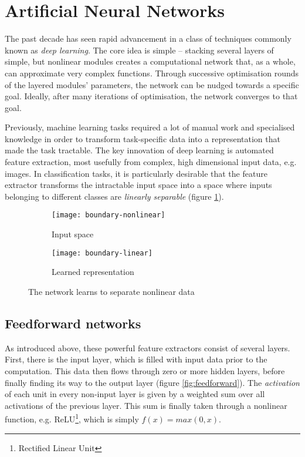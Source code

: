 \documentclass[../../report.tex]{subfiles}
\begin{document}
\section{Artificial Neural Networks}

The past decade has seen rapid advancement in a class of techniques commonly
known as \emph{deep learning}. The core idea is simple -- stacking several
layers of simple, but nonlinear modules creates a computational network that, as
a whole, can approximate very complex functions. Through successive optimisation
rounds of the layered modules' parameters, the network can be nudged towards a
specific goal. Ideally, after many iterations of optimisation, the network
converges to that goal.

Previously, machine learning tasks required a lot of manual work and specialised
knowledge in order to transform task-specific data into a representation that
made the task tractable. The key innovation of deep learning is automated
feature extraction, most usefully from complex, high dimensional input data,
e.g. images. In classification tasks, it is particularly desirable that the
feature extractor transforms the intractable input space into a space where
inputs belonging to different classes are \emph{linearly separable} (figure
\ref{fig:representation-learning}). \cite{LeCun2015}

\begin{figure}
  \centering
  \begin{subfigure}[b]{0.49\textwidth}
    \centering
    \texttt{[image: boundary-nonlinear]}
    \caption{Input space}
  \end{subfigure}
  \hfill
  \begin{subfigure}[b]{0.49\textwidth}
    \centering
    \texttt{[image: boundary-linear]}
    \caption{Learned representation}
  \end{subfigure}
  \caption{The network learns to separate nonlinear data \cite{Olah2014}}
  \label{fig:representation-learning}
\end{figure}

\subsection{Feedforward networks}

As introduced above, these powerful feature extractors consist of several
layers. First, there is the input layer, which is filled with input data prior
to the computation. This data then flows through zero or more hidden layers,
before finally finding its way to the output layer (figure
\ref{fig:feedforward}). The \emph{activation} of each unit in every non-input
layer is given by a weighted sum over all activations of the previous layer.
This sum is finally taken through a nonlinear function, e.g.
ReLU\footnote{Rectified Linear Unit}, which is simply $f(x) = max(0, x)$.
\end{document}
